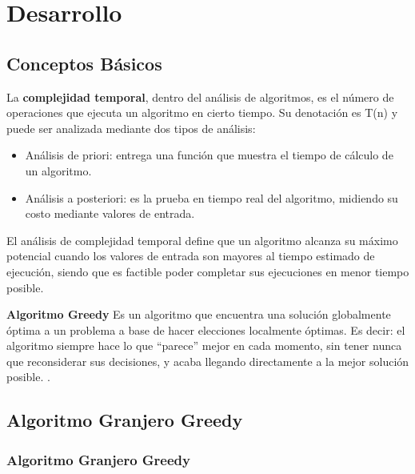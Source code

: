 \chapter{Desarrollo}

\section{Conceptos Básicos}
    La \textbf{complejidad temporal}, dentro del análisis de algoritmos, es el número de operaciones que ejecuta un algoritmo en cierto tiempo. Su denotación es T(n) y puede ser analizada mediante dos tipos de análisis:
    
    \begin{itemize}
        \item Análisis de priori: entrega una función que muestra el tiempo de cálculo de un algoritmo.
        \item Análisis a posteriori: es la prueba en tiempo real del algoritmo, midiendo su costo mediante valores de entrada. 
    \end{itemize}
    
    El análisis de complejidad temporal define que un algoritmo alcanza su máximo potencial cuando los valores de entrada son mayores al tiempo estimado de ejecución, siendo que es factible poder completar sus ejecuciones en menor tiempo posible. 
    
    \textbf{Algoritmo Greedy} Es un algoritmo que encuentra una solución globalmente óptima a un problema a base de hacer elecciones localmente óptimas. Es decir: el algoritmo siempre hace lo que “parece” mejor en cada momento, sin tener nunca que reconsiderar sus decisiones, y acaba llegando directamente a la mejor solución posible. \cite{Voraz}.

    
    
    
\newpage
\section{Algoritmo Granjero Greedy}
    \subsection{Algoritmo Granjero Greedy}
   
